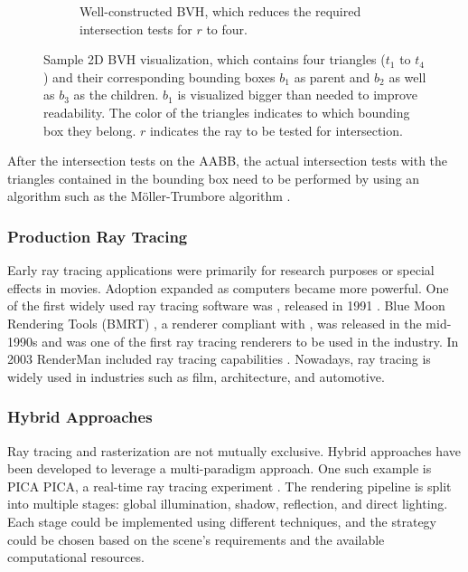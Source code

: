 \begin{figure}[H]
\begin{subfigure}[b]{0.45\textwidth}
    \caption{Well-constructed \gls{BVH}, which reduces the required intersection tests for $r$ to four.}
    \label{fig:bvhGood}
  \end{subfigure}
  \caption{Sample 2D \gls{BVH} visualization, which contains four triangles ($t_1$ to $t_4$) and their corresponding bounding boxes $b_1$ as parent and $b_2$ as well as $b_3$ as the children. $b_1$ is visualized bigger than needed to improve readability. The color of the triangles indicates to which bounding box they belong. $r$ indicates the ray to be tested for intersection.}
  \label{fig:bvhVisualized}
\end{figure}

After the intersection tests on the \gls{AABB}, the actual intersection tests with the triangles contained in the bounding box need to be performed by using an algorithm such as the Möller-Trumbore algorithm \cite{mollerTrumboreFastRayTriangleIntersection}.

\subsubsection{Production Ray Tracing}

Early ray tracing applications were primarily for research purposes or special effects in movies. Adoption expanded as computers became more powerful. One of the first widely used ray tracing software was , released in 1991 \cite{POV_Ray_Documentation}. Blue Moon Rendering Tools (\gls{BMRT}) \cite{bmrt}, a renderer compliant with , was released in the mid-1990s and was one of the first ray tracing renderers to be used in the industry. In 2003 \gls{RenderMan} included ray tracing capabilities \cite{RenderMan_11_Release_Notes}. Nowadays, ray tracing is widely used in industries such as film, architecture, and automotive.

\subsubsection{Hybrid Approaches}

Ray tracing and rasterization are not mutually exclusive. Hybrid approaches have been developed to leverage a multi-paradigm approach. One such example is PICA PICA, a real-time ray tracing experiment \cite{hybridRenderingBarreBrisebois2019}. The rendering pipeline is split into multiple stages: global illumination, shadow, reflection, and direct lighting. Each stage could be implemented using different techniques, and the strategy could be chosen based on the scene's requirements and the available computational resources.

